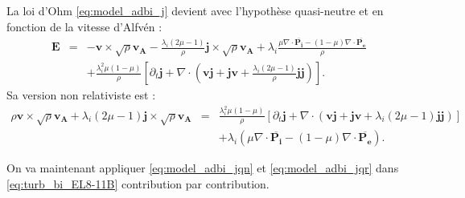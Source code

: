 La loi d'Ohm \eqref{eq:model_adbi_j} devient avec l'hypothèse quasi-neutre et en fonction de la vitesse d'Alfvén : 
\begin{eqnarray}
\label{eq:model_adbi_jqn} \boldsymbol{E} &=& -  \boldsymbol{v}  \times \sqrt{\rho}\boldsymbol{v_A}
-   \frac{\lambda_i(2\mu-1)}{\rho}  \boldsymbol{j} \times \sqrt{\rho}\boldsymbol{v_A}
+  \lambda_i \frac{\mu \nabla \cdot \overline{\boldsymbol{P_i}} - (1-\mu) \nabla \cdot \overline{\boldsymbol{P_e}}}{\rho} \nonumber\\
&&+\frac{\lambda_i^2 \mu (1-\mu)}{\rho} \left[\partial_t \boldsymbol{j} + \nabla \cdot (
  \boldsymbol{v}  \boldsymbol{j}  
+  \boldsymbol{j}  \boldsymbol{v} 
+\frac{ \lambda_i(2\mu -1 )}{\rho}\boldsymbol{j} \boldsymbol{j} ) \right] . 
\end{eqnarray}
Sa version non relativiste est :
\begin{eqnarray}
\label{eq:model_adbi_jqr}   \rho \boldsymbol{v}  \times \sqrt{\rho}\boldsymbol{v_A}
+   \lambda_i(2\mu-1)  \boldsymbol{j} \times \sqrt{\rho}\boldsymbol{v_A} 
&=&\frac{\lambda_i^2 \mu (1-\mu)}{\rho} \left[\partial_t \boldsymbol{j} + \nabla \cdot (
  \boldsymbol{v}  \boldsymbol{j}  
+  \boldsymbol{j}  \boldsymbol{v} 
+\lambda_i(2\mu -1 )\boldsymbol{j} \boldsymbol{j} ) \right] \nonumber\\
&&+\lambda_i (\mu \nabla \cdot \overline{\boldsymbol{P_i}} - (1-\mu) \nabla \cdot \overline{\boldsymbol{P_e}}) .
\end{eqnarray}

On va maintenant appliquer \eqref{eq:model_adbi_jqn} et \eqref{eq:model_adbi_jqr} dans \eqref{eq:turb_bi_EL8-11B} contribution par contribution.
